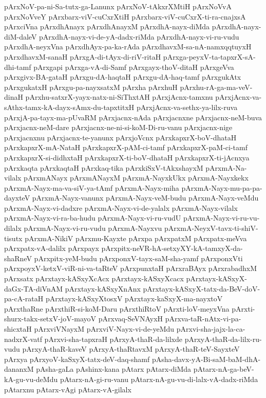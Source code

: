 {pArxNoV-pa-ni-Sa-tutx-ga-Lanunx
pArxNoV-tAkxrXMtiH
pArxNoVvA
pArxNoVveY
pArxbarx-viV-cuCxrXtiH
pArxbarx-viV-cuCxrX-ti-ra-cnajxsA
pArxciVna
pArxdhAnayx
pArxdhAnayxM
pArxdhA-nayx-diMda
pArxdhA-nayx-diM-daleV
pArxdhA-nayx-vi-de-yA-dadx-riMda
pArxdhA-nayx-vi-ru-vudu
pArxdhA-neyxVna
pArxdhAyx-pa-ka-rAda
pArxdhavxM-sa-nA-namxqqtuyxH
pArxdhavxM-sanaH
pArxgA-di-tAyx-di-riV-ritaH
pArxga-peyxV-ta-tapxrX-sA-dhi-tamf
pArxgapi
pArxga-vA-di-Samf
pArxgayx-thoV-ditaH
pArxgeVva
pArxgivx-BA-gataH
pArxgu-dA-haqtaH
pArxgu-dA-haq-tamf
pArxgukAtx
pArxgukatxH
pArxgu-pa-nayxsatxM
pArxha
pArxhuH
pArxhu-rA-ga-ma-veV-dinaH
pArxhu-satxrX-yayx-natx-ni-SiThxtAH
pArxjAcnx-tamxnu
pArxjAcnx-va-sAthx-tamx-kA-dayx-sAmx-du-tapxtitxH
pArxjAcnx-va-sethx-ya-lilx-ruva
pArxjA-pa-tayx-ma-pUvaRM
pArxjacnx-nAda
pArxjacnxne
pArxjacnx-neM-buva
pArxjacnx-neM-dare
pArxjacnx-ne-ni-si-koM-Di-ru-vanu
pArxjacnx-nige
pArxjacnxnu
pArxjacnx-te-yanunx
pArxjoVcnx
pArxkapxrX-boV-dhataH
pArxkapxrX-mA-NataH
pArxkapxrX-pAM-ci-tamf
pArxkapxrX-paM-ci-tamf
pArxkapxrX-si-didhxtaH
pArxkapxrX-ti-boV-dhataH
pArxkapxrX-ti-jAcnxya
pArxkaqta
pArxkaqtaH
pArxkaq-tika
pArxkiSxV-tAkxshayxM
pArxmA-Na-vilalx
pArxmANayx
pArxmANayxM
pArxmA-NayxkUkx
pArxmA-Nayxkekx
pArxmA-Nayx-ma-va-siV-ya-tAmf
pArxmA-Nayx-miha
pArxmA-Nayx-mu-pa-pa-dayxteV
pArxmA-Nayx-vanunx
pArxmA-Nayx-veM-budu
pArxmA-Nayx-veMdu
pArxmA-Nayx-vi-dadxre
pArxmA-Nayx-vi-de-yalalx
pArxmA-Nayx-vilalx
pArxmA-Nayx-vi-ra-ba-hudu
pArxmA-Nayx-vi-ru-vudU
pArxmA-Nayx-vi-ru-vu-dilalx
pArxmA-Nayx-vi-ru-vudu
pArxmA-Nayxvu
pArxmA-NeyxV-tavx-ti-shiV-tisutx
pArxmA-NikiV
pArxmu-Kayxte
pArxpa
pArxpatxM
pArxpatx-meVva
pArxpatx-vA-dalilx
pArxpayx
pArxpitx-neVR-hA-setxyXY-kA-tamxyX-da-shaRneV
pArxpitx-yeM-budu
pArxponxV-tayx-saM-sha-yamf
pArxponxVti
pArxpoyxV-ketxV-viR-ni-va-taRteV
pArxpunxtaH
pArxraBAyx
pArxrabadhxM
pArxsatx
pArxtayx-kASxyXcAcx
pArxtayx-kASxyXcacx
pArxtayx-kASxyX-daGx-TA-diVnAM
pArxtayx-kASxyXnAnx
pArxtayx-kASxyX-tatx-da-BeV-doV-pa-cA-rataH
pArxtayx-kASxyXtosxV
pArxtayx-kaSxyX-ma-nayxtoV
pArxthaRne
pArxthiR-si-koM-Daru
pArxthiRtoV
pArxti-loV-meyxVna
pArxti-shurx-takx-setxV-joV-mayoV
pArxvaq-SeVNAyxH
pArxva-taR-nAtx-vi-pa-shicxtaH
pArxviVNayxM
pArxviV-Nayx-vi-de-yeMdu
pArxvi-sha-jajx-la-ca-nadxrX-vatf
pArxvi-sha-tapxraH
pArxyA-thaR-da-lilxde
pArxyA-thaR-da-lilx-ru-vudu
pArxyA-thaR-kaveV
pArxyA-thaRtavxM
pArxyA-thaR-teV-SayxteV
pArxya
pArxyoV-kaSxyX-tatx-deV-daq-shamf
pAsha-davx-yA-Bi-saM-baM-dhA-dananxM
pAsha-gaLa
pAshinx-kana
pAtarx
pAtarx-diMda
pAtarx-nA-ga-beV-kA-gu-vu-deMdu
pAtarx-nA-gi-ru-vanu
pAtarx-nA-gu-vu-di-lalx-vA-dadx-riMda
pAtarxnu
pAtarx-vAgi
pAtarx-vA-gilalx
}
